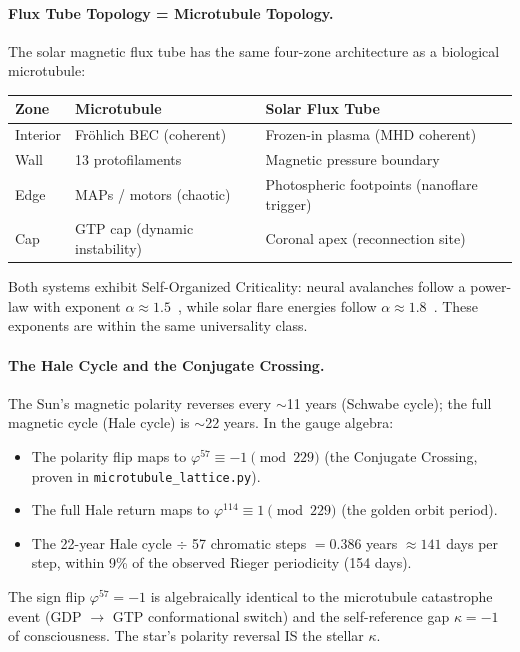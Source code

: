 \paragraph{Flux Tube Topology = Microtubule Topology.}
The solar magnetic flux tube has the same four-zone architecture as a biological microtubule:
\begin{center}
\begin{tabular}{lll}
\hline
Zone & Microtubule & Solar Flux Tube \\
\hline
Interior & Fröhlich BEC (coherent) & Frozen-in plasma (MHD coherent) \\
Wall & 13 protofilaments & Magnetic pressure boundary \\
Edge & MAPs / motors (chaotic) & Photospheric footpoints (nanoflare trigger) \\
Cap & GTP cap (dynamic instability) & Coronal apex (reconnection site) \\
\hline
\end{tabular}
\end{center}
Both systems exhibit Self-Organized Criticality: neural avalanches follow a power-law with exponent $\alpha \approx 1.5$~\cite{beggs2003}, while solar flare energies follow $\alpha \approx 1.8$~\cite{lu1991}. These exponents are within the same universality class.

\paragraph{The Hale Cycle and the Conjugate Crossing.}
The Sun's magnetic polarity reverses every $\sim$11 years (Schwabe cycle); the full magnetic cycle (Hale cycle) is $\sim$22 years. In the gauge algebra:
\begin{itemize}
    \item The polarity flip maps to $\varphi^{57} \equiv -1 \pmod{229}$ (the Conjugate Crossing, proven in \texttt{microtubule\_lattice.py}).
    \item The full Hale return maps to $\varphi^{114} \equiv 1 \pmod{229}$ (the golden orbit period).
    \item The 22-year Hale cycle $\div$ 57 chromatic steps $= 0.386$ years $\approx 141$ days per step, within 9\% of the observed Rieger periodicity (154 days).
\end{itemize}
The sign flip $\varphi^{57} = -1$ is algebraically identical to the microtubule catastrophe event (GDP $\to$ GTP conformational switch) and the self-reference gap $\kappa = -1$ of consciousness. The star's polarity reversal IS the stellar $\kappa$.

